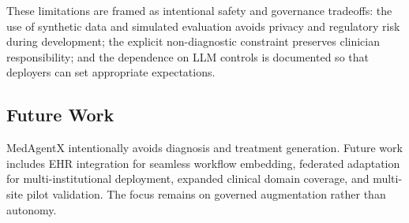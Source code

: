 \documentclass[journal]{IEEEtran}
\begin{document}
These limitations are framed as intentional safety and governance tradeoffs: the use of synthetic data and simulated evaluation avoids privacy and regulatory risk during development; the explicit non-diagnostic constraint preserves clinician responsibility; and the dependence on LLM controls is documented so that deployers can set appropriate expectations.

\subsection{Future Work}
MedAgentX intentionally avoids diagnosis and treatment generation. Future work includes EHR integration for seamless workflow embedding, federated adaptation for multi-institutional deployment, expanded clinical domain coverage, and multi-site pilot validation. The focus remains on governed augmentation rather than autonomy.
\end{document}
